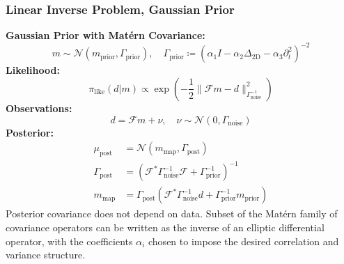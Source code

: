 \begin{frame}
    \frametitle{Linear Inverse Problem, Gaussian Prior}
    \textbf{Gaussian Prior with Matérn Covariance:}
    \[
    m \sim \mathcal{N}(m_{\text{prior}}, \Gamma_{\!\text{prior}}), \quad \Gamma_{\!\text{prior}} \coloneqq \left( \alpha_1 I - \alpha_2 \Delta_{\text{2D}} - \alpha_3 \partial_t^2 \right)^{-2}
    \]
    \textbf{Likelihood:}
    \[
    \pi_{\text{like}}(d|m) \propto \exp\left(-\frac{1}{2} \|\mathcal{F}m - d\|_{\Gamma_{\!\text{noise}}^{-1}}^2\right)
    \]
    \textbf{Observations:}
    \[
    d = \mathcal{F}m + \nu, \quad \nu \sim \mathcal{N}(0, \Gamma_{\!\text{noise}})
    \]
    \textbf{Posterior:}
    \[
    \begin{aligned}
    \mu_{\text{post}} &= \mathcal{N}(m_{\text{map}}, \Gamma_{\!\text{post}}) \\
    \Gamma_{\!\text{post}} &= \left(\mathcal{F}^* \Gamma_{\!\text{noise}}^{-1} \mathcal{F} + \Gamma_{\!\text{prior}}^{-1}\right)^{-1} \\
    m_{\text{map}} &= \Gamma_{\!\text{post}}\left(\mathcal{F}^* \Gamma_{\!\text{noise}}^{-1} d + \Gamma_{\!\text{prior}}^{-1} m_{\text{prior}}\right)
    \end{aligned}
    \]
    \footnotesize{Posterior covariance does not depend on data. Subset of the Matérn family of covariance operators can be written as the inverse of an elliptic differential operator, with the coefficients \(\alpha_i\) chosen to impose the desired correlation and variance structure.}
\end{frame}

